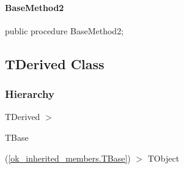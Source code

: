 \documentclass{report}
\newif\ifpdf
\begin{document}
\paragraph*{BaseMethod2}\hspace*{\fill}

\label{ok_inherited_members.TBase-BaseMethod2}
\begin{list}{}{
\setlength{\itemindent}{0cm}
\setlength{\listparindent}{0cm}
\setlength{\leftmargin}{\evensidemargin}
\addtolength{\leftmargin}{\tmplength}
\settowidth{\labelsep}{X}
\addtolength{\leftmargin}{\labelsep}
\setlength{\labelwidth}{\tmplength}
}
\item[\textbf{Declaration}\hfill]
\ifpdf
\begin{flushleft}
\fi
\begin{ttfamily}
public procedure BaseMethod2;\end{ttfamily}

\ifpdf
\end{flushleft}
\fi

\end{list}
\ifpdf
\subsection*{\large{\textbf{TDerived Class}}\normalsize\hspace{1ex}\hrulefill}
\else
\subsection*{TDerived Class}
\fi
\label{ok_inherited_members.TDerived}
\subsubsection*{\large{\textbf{Hierarchy}}\normalsize\hspace{1ex}\hfill}
TDerived {$>$} \begin{ttfamily}TBase\end{ttfamily}(\ref{ok_inherited_members.TBase}) {$>$} 
TObject
\end{document}
